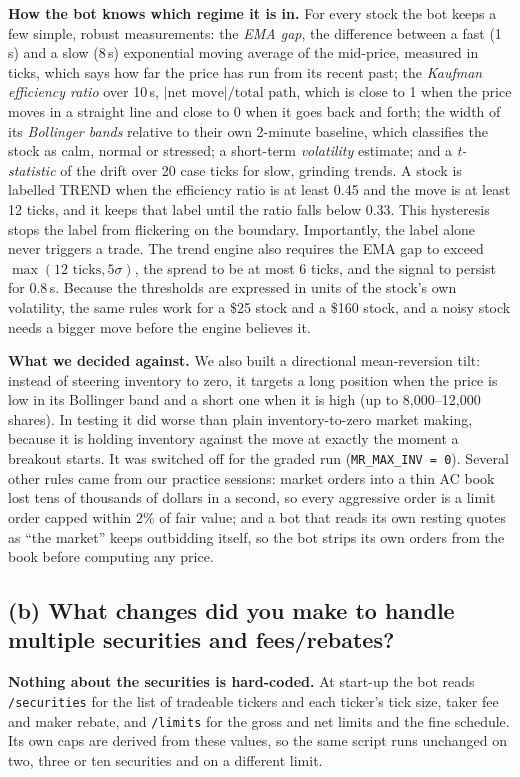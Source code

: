 \documentclass[10pt]{article}
\newcommand{\code}[1]{\texttt{#1}}
\newcommand{\q}[1]{\vspace{4pt}\subsection*{#1}\vspace{-2pt}}
\begin{document}
\textbf{How the bot knows which regime it is in.} For every stock the bot keeps a few simple, robust measurements:
the \emph{EMA gap}, the difference between a fast (1\,s) and a slow (8\,s) exponential moving average of the mid-price, measured in ticks, which says how far the
price has run from its recent past; the \emph{Kaufman efficiency ratio} over 10\,s, $|\text{net move}|/\text{total path}$, which is close to 1 when the price moves in a
straight line and close to 0 when it goes back and forth; the width of its \emph{Bollinger bands} relative to their own 2-minute baseline, which classifies the stock as
calm, normal or stressed; a short-term \emph{volatility} estimate; and a \emph{t-statistic} of the drift over 20 case ticks for slow, grinding trends. A stock is labelled
TREND when the efficiency ratio is at least 0.45 and the move is at least 12 ticks, and it keeps that label until the ratio falls below 0.33. This hysteresis stops the label
from flickering on the boundary. Importantly, the label alone never triggers a trade. The trend engine also requires the EMA gap to exceed $\max(12\text{ ticks}, 5\sigma)$,
the spread to be at most 6 ticks, and the signal to persist for 0.8\,s. Because the thresholds are expressed in units of the stock's own volatility, the same rules work for a
\$25 stock and a \$160 stock, and a noisy stock needs a bigger move before the engine believes it.

\textbf{What we decided against.} We also built a directional mean-reversion tilt: instead of steering inventory to zero, it targets a long position when the price is low in
its Bollinger band and a short one when it is high (up to 8{,}000--12{,}000 shares). In testing it did worse than plain inventory-to-zero market making, because it is holding
inventory against the move at exactly the moment a breakout starts. It was switched off for the graded run (\code{MR\_MAX\_INV = 0}). Several other rules came from our practice
sessions: market orders into a thin AC book lost tens of thousands of dollars in a second, so every aggressive order is a limit order capped within 2\% of fair value; and a
bot that reads its own resting quotes as ``the market'' keeps outbidding itself, so the bot strips its own orders from the book before computing any price.

\q{(b) What changes did you make to handle multiple securities and fees/rebates?}

\textbf{Nothing about the securities is hard-coded.} At start-up the bot reads \code{/securities} for the list of tradeable tickers and each ticker's tick size, taker fee
and maker rebate, and \code{/limits} for the gross and net limits and the fine schedule. Its own caps are derived from these values, so the same script runs unchanged on
two, three or ten securities and on a different limit.
\end{document}
